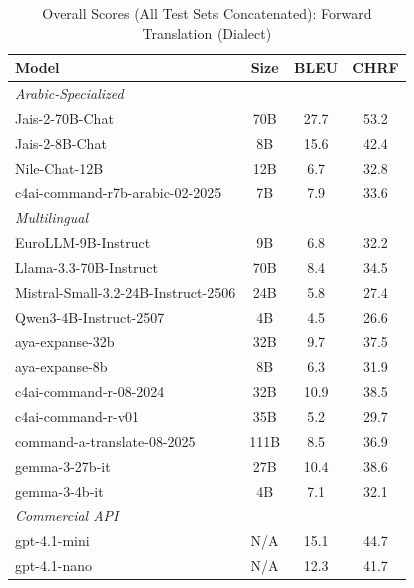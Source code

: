 \begin{table}[htbp]
\centering
\caption{Overall Scores (All Test Sets Concatenated): Forward Translation (Dialect)}
\label{tab:overall_scores_forward_dialect}
\begin{tabular}{l@{\hspace{3pt}}c@{\hspace{3pt}}c@{\hspace{3pt}}c}
\toprule
Model & Size & BLEU & CHRF \\
\midrule
\multicolumn{4}{l}{\textit{Arabic-Specialized}} \\
\midrule
Jais-2-70B-Chat & 70B & 27.7 & 53.2 \\
Jais-2-8B-Chat & 8B & 15.6 & 42.4 \\
Nile-Chat-12B & 12B & 6.7 & 32.8 \\
c4ai-command-r7b-arabic-02-2025 & 7B & 7.9 & 33.6 \\
\midrule
\multicolumn{4}{l}{\textit{Multilingual}} \\
\midrule
EuroLLM-9B-Instruct & 9B & 6.8 & 32.2 \\
Llama-3.3-70B-Instruct & 70B & 8.4 & 34.5 \\
Mistral-Small-3.2-24B-Instruct-2506 & 24B & 5.8 & 27.4 \\
Qwen3-4B-Instruct-2507 & 4B & 4.5 & 26.6 \\
aya-expanse-32b & 32B & 9.7 & 37.5 \\
aya-expanse-8b & 8B & 6.3 & 31.9 \\
c4ai-command-r-08-2024 & 32B & 10.9 & 38.5 \\
c4ai-command-r-v01 & 35B & 5.2 & 29.7 \\
command-a-translate-08-2025 & 111B & 8.5 & 36.9 \\
gemma-3-27b-it & 27B & 10.4 & 38.6 \\
gemma-3-4b-it & 4B & 7.1 & 32.1 \\
\midrule
\multicolumn{4}{l}{\textit{Commercial API}} \\
\midrule
gpt-4.1-mini & N/A & 15.1 & 44.7 \\
gpt-4.1-nano & N/A & 12.3 & 41.7 \\
\midrule
\bottomrule
\end{tabular}
\end{table}